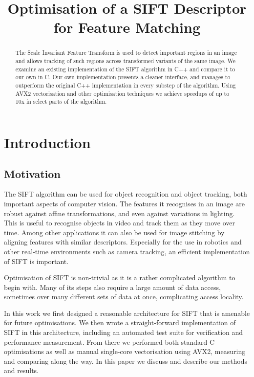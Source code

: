 \documentclass[letterpaper]{article}
\title{Optimisation of a SIFT Descriptor for Feature Matching}
\begin{document}
\maketitle

\begin{abstract}
The Scale Invariant Feature Transform is used to detect important regions in an image and allows tracking of such regions across transformed variants of the same image. We examine an existing implementation of the SIFT algorithm in C++ and compare it to our own in C. Our own implementation presents a cleaner interface, and manages to outperform the original C++ implementation in every substep of the algorithm. Using AVX2 vectorisation and other optimisation techniques we achieve speedups of up to 10x in select parts of the algorithm.
\end{abstract}

\section{Introduction}\label{sec:intro}
\subsection*{Motivation}
The SIFT algorithm can be used for object recognition and object tracking, both important aspects of computer vision. The features it recognises in an image are robust against affine transformations, and even against variations in lighting. This is useful to recognise objects in video and track them as they move over time. Among other applications it can also be used for image stitching by aligning features with similar descriptors. Especially for the use in robotics and other real-time environments such as camera tracking, an efficient implementation of SIFT is important.

Optimisation of SIFT is non-trivial as it is a rather complicated algorithm to begin with. Many of its steps also require a large amount of data access, sometimes over many different sets of data at once, complicating access locality.

In this work we first designed a reasonable architecture for SIFT that is amenable for future optimisations. We then wrote a straight-forward implementation of SIFT in this architecture, including an automated test suite for verification and performance measurement. From there we performed both standard C optimisations as well as manual single-core vectorisation using AVX2, measuring and comparing along the way. In this paper we discuss and describe our methods and results.
\end{document}
